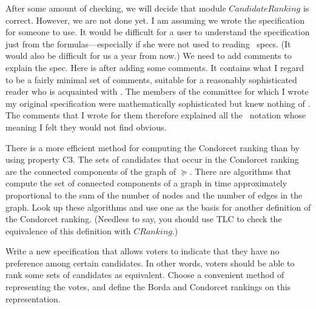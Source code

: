 \documentclass[fleqn,leqno]{article}
\begin{document}
\medskip

After some amount of checking, we will decide that module
$CandidateRanking$ is correct.  However, we are not done yet.  I am
assuming we wrote the specification for someone to use.  It would be
difficult for a user to understand the specification just from the
formulas---especially if she were not used to reading \tlaplus\ specs.
(It would also be difficult for us a year from now.)  We need to add
comments to explain the spec.  Here is
after adding some comments.  It contains what I regard to be a fairly
minimal set of comments, suitable for a reasonably sophisticated
reader who is acquainted with \tlaplus.  The members of the committee
for which I wrote my original specification were mathematically
sophisticated but knew nothing of \tlaplus.  The comments that I wrote
for them therefore explained all the \tlaplus\ notation whose meaning
I felt they would not find obvious.


\begin{problem}
There is a more efficient method for computing the Condorcet ranking
than by using property C3.  The sets of candidates that occur in the
Condorcet ranking are the connected components of the graph of
$\succeq$.  There are algorithms that compute the set of connected
components of a graph in time approximately proportional to the sum of
the number of nodes and the number of edges in the graph.  Look up
these algorithms and use one as the basis for another definition of
the Condorcet ranking.  (Needless to say, you should use TLC to check
the equivalence of this definition with $CRanking$.)
\end{problem}

\begin{problem}
Write a new specification that allows voters to indicate that they
have no preference among certain candidates.  In other words, voters
should be able to rank some sets of candidates as equivalent.  Choose
a convenient method of representing the votes, and define the Borda
and Condorcet rankings on this representation.
\end{problem}

\end{document}
